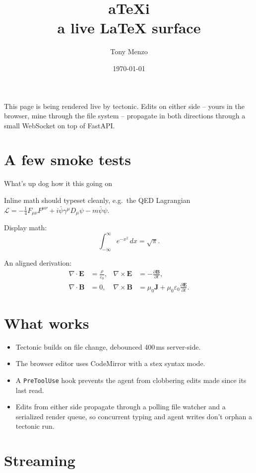 \documentclass[11pt]{article}
\title{aTeXi \\ \large a live LaTeX surface}
\author{Tony Menzo}
\date{\today}
\begin{document}
\maketitle

\noindent
This page is being rendered live by tectonic. Edits on either side --
yours in the browser, mine through the file system -- propagate in both
directions through a small WebSocket on top of FastAPI.

\section*{A few smoke tests}

What's up dog how it this going on

Inline math should typeset cleanly, e.g.\ the QED Lagrangian
$\mathcal{L} = -\tfrac{1}{4} F_{\mu\nu} F^{\mu\nu} + i\bar\psi\gamma^\mu D_\mu \psi - m\bar\psi\psi$.

Display math:
\[
  \int_{-\infty}^{\infty} e^{-x^2}\, dx = \sqrt{\pi}.
\]

An aligned derivation:
\begin{align*}
  \nabla \cdot \mathbf{E} &= \frac{\rho}{\varepsilon_0}, &
  \nabla \times \mathbf{E} &= -\frac{\partial \mathbf{B}}{\partial t}, \\
  \nabla \cdot \mathbf{B} &= 0, &
  \nabla \times \mathbf{B} &= \mu_0 \mathbf{J} + \mu_0 \varepsilon_0 \frac{\partial \mathbf{E}}{\partial t}.
\end{align*}

\section*{What works}

\begin{itemize}
  \item Tectonic builds on file change, debounced 400\,ms server-side.
  \item The browser editor uses CodeMirror with a stex syntax mode.
  \item A \texttt{PreToolUse} hook prevents the agent from clobbering
        edits made since its last read.
  \item Edits from either side propagate through a polling file watcher
        and a serialized render queue, so concurrent typing and agent
        writes don't orphan a tectonic run.
\end{itemize}


\section*{Streaming}
\end{document}
